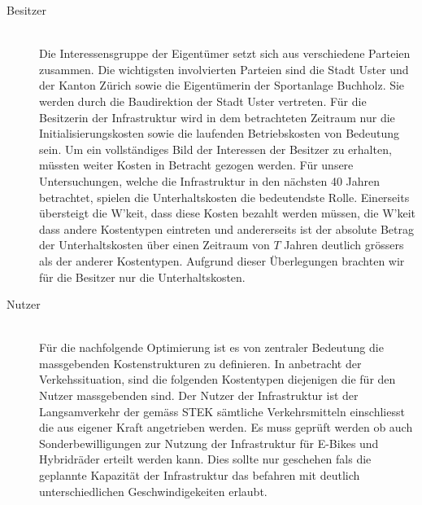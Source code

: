 %
%
%
%

\label{subsec:Gruppen}

\begin{description}
\item[Besitzer]\hfill \\
Die Interessensgruppe der Eigentümer setzt sich aus verschiedene Parteien zusammen. Die wichtigsten involvierten Parteien sind die Stadt Uster und der Kanton Zürich sowie die Eigentümerin der Sportanlage Buchholz. Sie werden durch die Baudirektion der Stadt Uster vertreten.
Für die Besitzerin der Infrastruktur wird in dem betrachteten Zeitraum nur die Initialisierungskosten sowie die laufenden Betriebskosten von Bedeutung sein. Um ein vollständiges Bild der Interessen der Besitzer zu erhalten, müssten weiter Kosten in Betracht gezogen werden. 
Für unsere Untersuchungen, welche die Infrastruktur in den nächsten 40 Jahren betrachtet, spielen die Unterhaltskosten die bedeutendste Rolle. Einerseits übersteigt die W'keit, dass diese Kosten bezahlt werden müssen, die W'keit dass andere Kostentypen eintreten und andererseits ist der absolute Betrag der Unterhaltskosten über einen Zeitraum von $T$ Jahren deutlich grössers als der anderer Kostentypen. Aufgrund dieser Überlegungen brachten wir für die Besitzer nur die Unterhaltskosten. 
\item[Nutzer]\hfill \\ 
Für die nachfolgende Optimierung ist es von zentraler Bedeutung die massgebenden Kostenstrukturen zu definieren. In anbetracht der Verkehssituation, sind die  folgenden Kostentypen diejenigen die für den Nutzer massgebenden sind. 
Der Nutzer der Infrastruktur ist der Langsamverkehr der gemäss STEK sämtliche Verkehrsmitteln einschliesst die aus eigener Kraft angetrieben werden. Es muss geprüft werden ob auch Sonderbewilligungen zur Nutzung der Infrastruktur für E-Bikes und Hybridräder erteilt werden kann. Dies sollte nur geschehen fals die geplannte Kapazität der Infrastruktur das befahren mit deutlich unterschiedlichen Geschwindigekeiten erlaubt.

\end{description}
